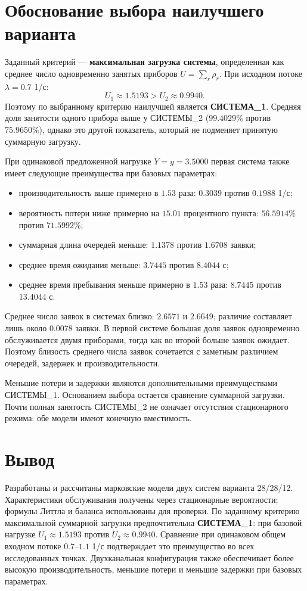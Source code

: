 \documentclass[a4paper,12pt]{article}
\begin{document}
    \section{Обоснование выбора наилучшего варианта}

    Заданный критерий --- \textbf{максимальная загрузка системы}, определенная
    как среднее число одновременно занятых приборов $U=\sum_r\rho_r$.
    При исходном потоке $\lambda=0.7$ 1/с:
    \[
        U_1\approx1.5193>U_2\approx0.9940.
    \]
    Поэтому по выбранному критерию наилучшей является \textbf{СИСТЕМА\_1}.
    Средняя доля занятости одного прибора выше у СИСТЕМЫ\_2
    ($99.4029\%$ против $75.9650\%$), однако это другой показатель,
    который не подменяет принятую суммарную загрузку.

    При одинаковой предложенной нагрузке $Y=y=3.5000$ первая система также
    имеет следующие преимущества при базовых параметрах:
    \begin{itemize}
        \item производительность выше примерно в $1.53$ раза:
        $0.3039$ против $0.1988$ 1/с;
        \item вероятность потери ниже примерно на $15.01$ процентного пункта:
        $56.5914\%$ против $71.5992\%$;
        \item суммарная длина очередей меньше: $1.1378$ против $1.6708$ заявки;
        \item среднее время ожидания меньше: $3.7445$ против $8.4044$ с;
        \item среднее время пребывания меньше примерно в $1.53$ раза:
        $8.7445$ против $13.4044$ с.
    \end{itemize}
    Среднее число заявок в системах близко: $2.6571$ и $2.6649$; различие
    составляет лишь около $0.0078$ заявки. В первой системе большая доля
    заявок одновременно обслуживается двумя приборами, тогда как во второй
    больше заявок ожидает. Поэтому близость среднего числа заявок сочетается
    с заметным различием очередей, задержек и производительности.

    Меньшие потери и задержки являются дополнительными преимуществами
    СИСТЕМЫ\_1. Основанием выбора остается сравнение суммарной загрузки.
    Почти полная занятость СИСТЕМЫ\_2 не означает отсутствия стационарного
    режима: обе модели имеют конечную вместимость.

    \section{Вывод}
    Разработаны и рассчитаны марковские модели двух систем варианта
    28/28/12. Характеристики обслуживания получены через стационарные
    вероятности; формулы Литтла и баланса использованы для проверки.
    По заданному критерию максимальной суммарной загрузки предпочтительна
    \textbf{СИСТЕМА\_1}: при базовой нагрузке $U_1\approx1.5193$ против
    $U_2\approx0.9940$. Сравнение при одинаковом общем входном потоке
    $0.7$--$1.1$ 1/с подтверждает это преимущество во всех исследованных
    точках. Двухканальная конфигурация также обеспечивает более высокую
    производительность, меньшие потери и меньшие задержки при базовых
    параметрах.
\end{document}
